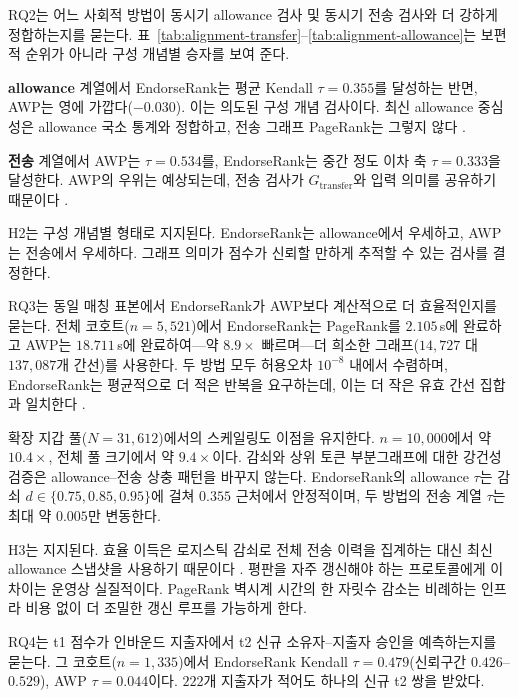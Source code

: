 
RQ2는 어느 사회적 방법이 동시기 allowance 검사 및 동시기 전송 검사와 더 강하게 정합하는지를 묻는다. 표~\ref{tab:alignment-transfer}--\ref{tab:alignment-allowance}는 보편적 순위가 아니라 구성 개념별 승자를 보여 준다.

\textbf{allowance} 계열에서 EndorseRank는 평균 Kendall $\tau=0.355$를 달성하는 반면, AWP는 영에 가깝다($-0.030$). 이는 의도된 구성 개념 검사이다. 최신 allowance 중심성은 allowance 국소 통계와 정합하고, 전송 그래프 PageRank는 그렇지 않다 .

\textbf{전송} 계열에서 AWP는 $\tau=0.534$를, EndorseRank는 중간 정도 이차 축 $\tau=0.333$을 달성한다. AWP의 우위는 예상되는데, 전송 검사가 $G_{\text{transfer}}$와 입력 의미를 공유하기 때문이다 .

H2는 구성 개념별 형태로 지지된다. EndorseRank는 allowance에서 우세하고, AWP는 전송에서 우세하다. 그래프 의미가 점수가 신뢰할 만하게 추적할 수 있는 검사를 결정한다.


RQ3는 동일 매칭 표본에서 EndorseRank가 AWP보다 계산적으로 더 효율적인지를 묻는다. 전체 코호트($n=5{,}521$)에서 EndorseRank는 PageRank를 $2.105$\,s에 완료하고 AWP는 $18.711$\,s에 완료하여---약 $8.9\times$ 빠르며---더 희소한 그래프($14{,}727$ 대 $137{,}087$개 간선)를 사용한다. 두 방법 모두 허용오차 $10^{-8}$ 내에서 수렴하며, EndorseRank는 평균적으로 더 적은 반복을 요구하는데, 이는 더 작은 유효 간선 집합과 일치한다 .

확장 지갑 풀($N=31{,}612$)에서의 스케일링도 이점을 유지한다. $n=10{,}000$에서 약 $10.4\times$, 전체 풀 크기에서 약 $9.4\times$이다. 감쇠와 상위 토큰 부분그래프에 대한 강건성 검증은 allowance--전송 상충 패턴을 바꾸지 않는다. EndorseRank의 allowance $\tau$는 감쇠 $d \in \{0.75, 0.85, 0.95\}$에 걸쳐 $0.355$ 근처에서 안정적이며, 두 방법의 전송 계열 $\tau$는 최대 약 $0.005$만 변동한다.

H3는 지지된다. 효율 이득은 로지스틱 감쇠로 전체 전송 이력을 집계하는 대신 최신 allowance 스냅샷을 사용하기 때문이다 . 평판을 자주 갱신해야 하는 프로토콜에게 이 차이는 운영상 실질적이다. PageRank 벽시계 시간의 한 자릿수 감소는 비례하는 인프라 비용 없이 더 조밀한 갱신 루프를 가능하게 한다.


RQ4는 t1 점수가 인바운드 지출자에서 t2 신규 소유자--지출자 승인을 예측하는지를 묻는다. 그 코호트($n=1{,}335$)에서 EndorseRank Kendall $\tau=0.479$(신뢰구간 $0.426$--$0.529$), AWP $\tau=0.044$이다. $222$개 지출자가 적어도 하나의 신규 t2 쌍을 받았다.

